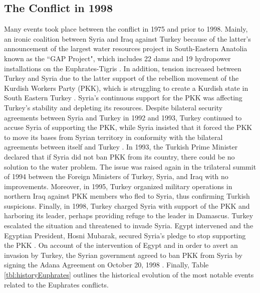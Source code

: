 \documentclass[letterpaper,12pt,titlepage,oneside,final]{book}
\begin{document}
\subsection{The Conflict in 1998}
Many events took place between the conflict in 1975 and prior to 1998. Mainly, an ironic coalition between Syria and Iraq against Turkey because of the latter's announcement of the largest water resources project in South-Eastern Anatolia known as the ``GAP Project", which includes 22 dams and 19 hydropower installations on the Euphrates-Tigris \citep{frenken2009irrigation}. In addition, tension increased between Turkey and Syria due to the latter support of the rebellion movement of the Kurdish Workers Party (PKK), which is struggling to create a Kurdish state in South Eastern Turkey \citep{guner1998signalling}. Syria's continuous support for the PKK was affecting Turkey's stability and depleting its resources. Despite bilateral security agreements between Syria and Turkey in 1992 and 1993, Turkey continued to accuse Syria of supporting the PKK, while Syria insisted that it forced the PKK to move its bases from Syrian territory in conformity with the bilateral agreements between itself and Turkey \citep{guner1998signalling}. In 1993, the Turkish Prime Minister declared that if Syria did not ban PKK from its country, there could be no solution to the water problem. The issue was raised again in the trilateral summit of 1994 between the Foreign Ministers of Turkey, Syria, and Iraq with no improvements. Moreover, in 1995, Turkey organized military operations in northern Iraq against PKK members who fled to Syria, thus confirming Turkish suspicions. Finally, in 1998, Turkey charged Syria with support of the PKK and harboring its leader, perhaps providing refuge to the leader in Damascus. Turkey escalated the situation and threatened to invade Syria. Egypt intervened and the Egyptian President, Hosni Mubarak, secured Syria's pledge to stop supporting the PKK \citep{akanda2007tigris}. On account of the intervention of Egypt and in order to avert an invasion by Turkey, the Syrian government agreed to ban PKK from Syria by signing the Adana Agreement on October 20, 1998 \citep{priscoli2009managing}. Finally, Table \ref{tbl:historyEuphrates} outlines the historical evolution of the most notable events related to the Euphrates conflicts.
\end{document}
